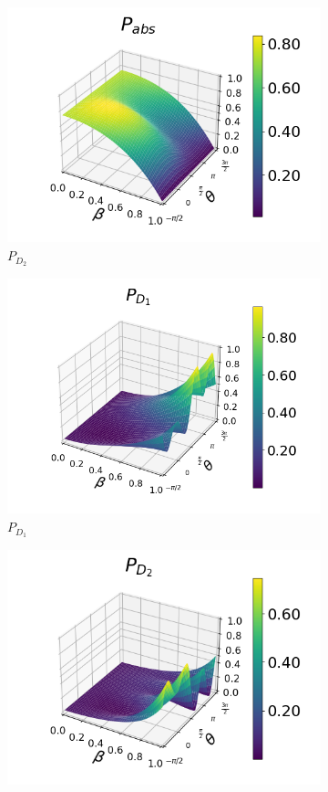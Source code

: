 \documentclass[12pt]{book}
\begin{document}
\begin{figure}[t!]
\begin{subfigure}[b]{0.3\linewidth}
\includegraphics[width=\linewidth]{images/pabs_3_pi4.png}
\caption{$P_{D_{2}}$ }
\label{fig:BS1}
\end{subfigure}
\begin{subfigure}[b]{0.3\linewidth}
\includegraphics[width=\linewidth]{images/pd1_5_pi4.png}
\caption{$P_{D_{1}}$ }
\label{fig:BS1}
\end{subfigure}
\begin{subfigure}[b]{0.3\linewidth}
\includegraphics[width=\linewidth]{images/pd2_5_pi4.png}

\end{subfigure}
\end{figure}
\end{document}
